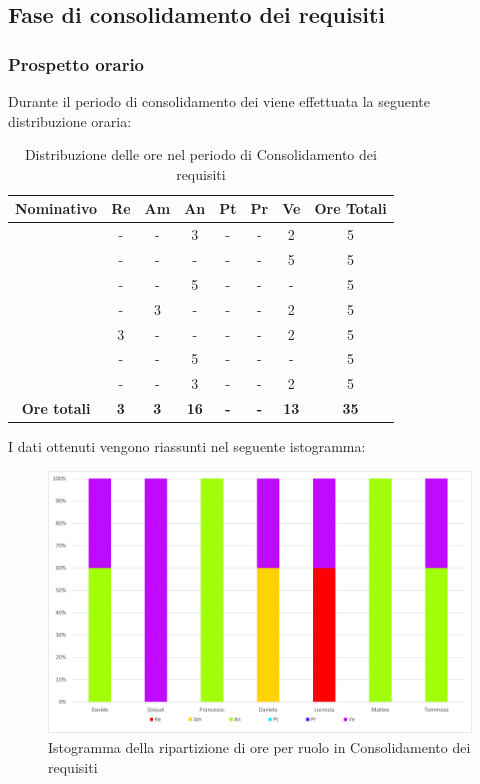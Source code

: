 \subsection{Fase di consolidamento dei requisiti}
\subsubsection{Prospetto orario}
Durante il periodo di consolidamento dei  viene effettuata la seguente distribuzione oraria:
\begin{table}[H]
		\begin{center}
			\setlength{\aboverulesep}{0pt}
			\setlength{\belowrulesep}{0pt}
			\setlength{\extrarowheight}{.75ex}
			\begin{tabular}{ c c c c c c c c }
				\rowcolor{AzzurroGruppo!30} 
				\textbf{Nominativo} & \textbf{Re} & \textbf{Am} & \textbf{An} & \textbf{Pt} & \textbf{Pr} & \textbf{Ve} & \textbf{Ore Totali}  \\
				\toprule
				\Davide    & - & - & 3 & - & - & 2 & 5 \\
				\Giosue    & - & - & - & - & - & 5 & 5 \\
				\Francesco & - & - & 5 & - & - & - & 5\\
				\Daniele   & - & 3 & - & - & - & 2 & 5\\
				\Lucrezia  & 3 & - & - & - & - & 2 & 5\\
				\Matteo    & - & - & 5 & - & - & - & 5\\
				\Tommaso    & - & - & 3 & - & - & 2 & 5\\
				 \textbf{Ore totali} & \textbf{3} & \textbf{3} & \textbf{16} & \textbf{-} & \textbf{-} & \textbf{13} & \textbf{35} \\
				\bottomrule
			\end{tabular}
			\caption{Distribuzione delle ore nel periodo di Consolidamento dei requisiti}
		\end{center}
	\end{table}
I dati ottenuti vengono riassunti nel seguente istogramma:
\begin{figure}[H]
    \centering
    \includegraphics[scale = 0.5]{components/img/Analisi-consolidamento-isto.png}
    \caption{Istogramma della ripartizione di ore per ruolo in Consolidamento dei requisiti}
    \label{fig:istogramma ripartizione ore , fase di Consolidamento dei Requisiti}
\end{figure}
